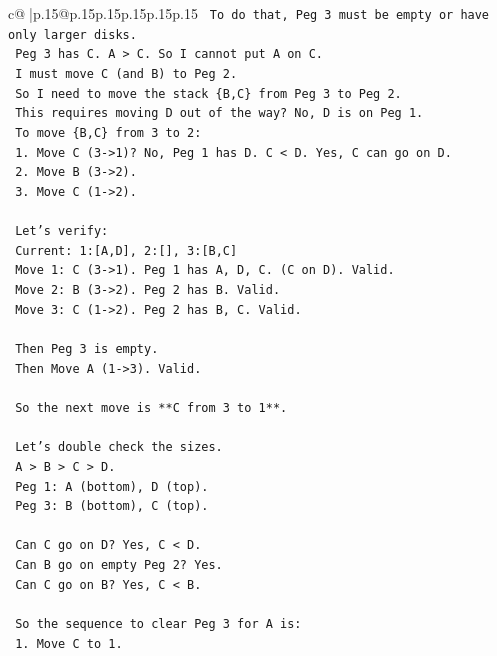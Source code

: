 \documentclass{article}
\begin{document}
{\begin{supertabular}{c@{$\;$}|p{.15\linewidth}@{}p{.15\linewidth}p{.15\linewidth}p{.15\linewidth}p{.15\linewidth}p{.15\linewidth}}
{{{\texttt{    To do that, Peg 3 must be empty or have only larger disks.} \\
\texttt{    Peg 3 has C. A > C. So I cannot put A on C.} \\
\texttt{    I must move C (and B) to Peg 2.} \\
\texttt{    So I need to move the stack \{B,C\} from Peg 3 to Peg 2.} \\
\texttt{    This requires moving D out of the way? No, D is on Peg 1.} \\
\texttt{    To move \{B,C\} from 3 to 2:} \\
\texttt{    1. Move C (3{-}>1)? No, Peg 1 has D. C < D. Yes, C can go on D.} \\
\texttt{    2. Move B (3{-}>2).} \\
\texttt{    3. Move C (1{-}>2).} \\
\\ 
\texttt{    Let's verify:} \\
\texttt{    Current: 1:{[}A,D{]}, 2:{[}{]}, 3:{[}B,C{]}} \\
\texttt{    Move 1: C (3{-}>1). Peg 1 has A, D, C. (C on D). Valid.} \\
\texttt{    Move 2: B (3{-}>2). Peg 2 has B. Valid.} \\
\texttt{    Move 3: C (1{-}>2). Peg 2 has B, C. Valid.} \\
\\ 
\texttt{    Then Peg 3 is empty.} \\
\texttt{    Then Move A (1{-}>3). Valid.} \\
\\ 
\texttt{    So the next move is **C from 3 to 1**.} \\
\\ 
\texttt{    Let's double check the sizes.} \\
\texttt{    A > B > C > D.} \\
\texttt{    Peg 1: A (bottom), D (top).} \\
\texttt{    Peg 3: B (bottom), C (top).} \\
\\ 
\texttt{    Can C go on D? Yes, C < D.} \\
\texttt{    Can B go on empty Peg 2? Yes.} \\
\texttt{    Can C go on B? Yes, C < B.} \\
\\ 
\texttt{    So the sequence to clear Peg 3 for A is:} \\
\texttt{    1. Move C to 1.} \\
}}}
\end{supertabular}}
\end{document}
